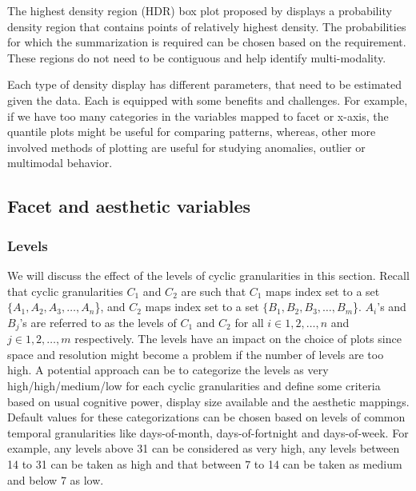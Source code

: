 \documentclass[12pt]{article}
\begin{document}
The highest density region (HDR) box plot proposed by \citep{Hyndman1996-ft} displays a probability density region that contains points of relatively highest density. The probabilities for which the summarization is required can be chosen based on the requirement. These regions do not need to be contiguous and help identify multi-modality.

Each type of density display has different parameters, that need to be estimated given the data. Each is equipped with some benefits and challenges. For example, if we have too many categories in the variables mapped to facet or x-axis, the quantile plots might be useful for comparing patterns, whereas, other more involved methods of plotting are useful for studying anomalies, outlier or multimodal behavior.

\hypertarget{facet-and-aesthetic-variables}{%
\subsection{Facet and aesthetic variables}\label{facet-and-aesthetic-variables}}

\hypertarget{levels}{%
\subsubsection{Levels}\label{levels}}

We will discuss the effect of the levels of cyclic granularities in this section. Recall that cyclic granularities \(C_1\) and \(C_2\) are such that \(C_1\) maps index set to a set \(\{A_1, A_2, A_3, \dots, A_n\)\}, and \(C_2\) maps index set to a set \(\{B_1, B_2, B_3, \dots, B_m\)\}. \(A_i\)'s and \(B_j\)'s are referred to as the levels of \(C_1\) and \(C_2\) for all \(i \in {1, 2, \dots, n}\) and \(j \in {1, 2, \dots, m}\) respectively. The levels have an impact on the choice of plots since space and resolution might become a problem if the number of levels are too high. A potential approach can be to categorize the levels as very high/high/medium/low for each cyclic granularities and define some criteria based on usual cognitive power, display size available and the aesthetic mappings. Default values for these categorizations can be chosen based on levels of common temporal granularities like days-of-month, days-of-fortnight and days-of-week. For example, any levels above 31 can be considered as very high, any levels between 14 to 31 can be taken as high and that between 7 to 14 can be taken as medium and below 7 as low.
\end{document}
